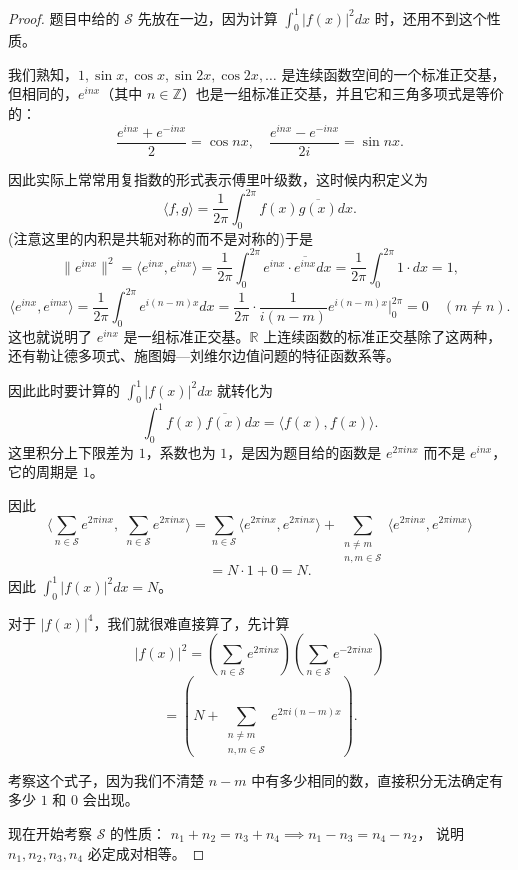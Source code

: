 \documentclass[12pt]{ctexart}  %
\begin{document}
\begin{proof}题目中给的 $\mathcal{S}$ 先放在一边，因为计算 $\displaystyle\int_0^1 |f(x)|^2 dx$ 时，还用不到这个性质。

\vspace{0.5em}
我们熟知，$1,\sin x,\cos x,\sin 2x,\cos 2x,\dots$ 是连续函数空间的一个标准正交基，
但相同的，$e^{inx}$（其中 $n\in\mathbb{Z}$）也是一组标准正交基，并且它和三角多项式是等价的：
\[
\frac{e^{inx} + e^{-inx}}{2} = \cos nx, \quad
\frac{e^{inx} - e^{-inx}}{2i} = \sin nx.
\]

因此实际上常常用复指数的形式表示傅里叶级数，这时候内积定义为
\[
\langle f,g\rangle = \frac{1}{2\pi}\int_0^{2\pi} f(x)\overline{g(x)} dx.
\]
(注意这里的内积是共轭对称的而不是对称的)于是
\[
\|e^{inx}\|^2 = \langle e^{inx},e^{inx}\rangle
= \frac{1}{2\pi}\int_0^{2\pi} e^{inx}\cdot\overline{e^{inx}} dx
= \frac{1}{2\pi}\int_0^{2\pi} 1\cdot dx = 1,
\]
\[
\langle e^{inx},e^{imx}\rangle
= \frac{1}{2\pi}\int_0^{2\pi} e^{i(n-m)x} dx
= \frac{1}{2\pi}\cdot\frac{1}{i(n-m)}e^{i(n-m)x}\bigg|_0^{2\pi}
= 0 \quad (m\neq n).
\]
这也就说明了 $e^{inx}$ 是一组标准正交基。$\mathbb{R}$ 上连续函数的标准正交基除了这两种，还有勒让德多项式、施图姆—刘维尔边值问题的特征函数系等。

因此此时要计算的 $\displaystyle\int_0^1 |f(x)|^2 dx$ 就转化为
\[
\int_0^1 f(x)\overline{f(x)} dx = \langle f(x),f(x)\rangle.
\]
这里积分上下限差为 $1$，系数也为 $1$，是因为题目给的函数是 $e^{2\pi i nx}$ 而不是 $e^{inx}$，它的周期是 $1$。

因此
\[
\Big\langle \sum_{n\in\mathcal{S}} e^{2\pi i nx},\; \sum_{n\in\mathcal{S}} e^{2\pi i nx} \Big\rangle
= \sum_{n\in\mathcal{S}} \langle e^{2\pi i nx},e^{2\pi i nx}\rangle
+ \sum_{\substack{n\neq m\\n,m\in\mathcal{S}}} \langle e^{2\pi i nx},e^{2\pi i mx}\rangle
\]
\[
= N\cdot 1 + 0 = N.
\]
因此 $\displaystyle\int_0^1 |f(x)|^2 dx = N$。

对于 $|f(x)|^4$，我们就很难直接算了，先计算
\[
|f(x)|^2 = \left( \sum_{n\in\mathcal{S}} e^{2\pi i nx} \right)
\left( \sum_{n\in\mathcal{S}} e^{-2\pi i nx} \right)
\]
\[
= \left( N + \sum_{\substack{n\neq m\\n,m\in\mathcal{S}}} e^{2\pi i (n-m)x} \right).
\]

考察这个式子，因为我们不清楚 $n-m$ 中有多少相同的数，直接积分无法确定有多少 $1$ 和 $0$ 会出现。

现在开始考察 $\mathcal{S}$ 的性质：
$n_1+n_2 = n_3+n_4 \implies n_1-n_3 = n_4-n_2$，
说明 $n_1,n_2,n_3,n_4$ 必定成对相等。


\end{proof}
\end{document}
